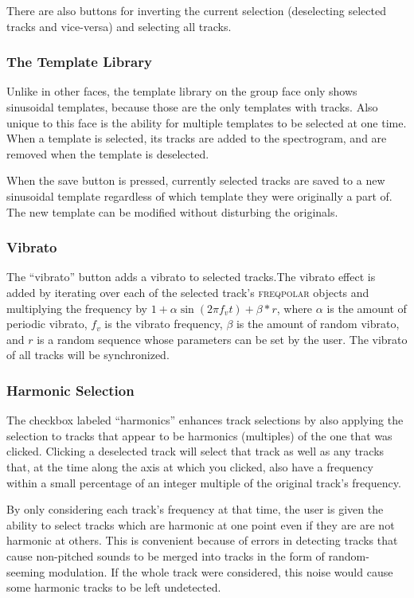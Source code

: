 \documentclass{article}
\newcommand{\noun}[1]{\textsc{#1}}
\begin{document}
There are also buttons for inverting the current selection (deselecting
selected tracks and vice-versa) and selecting all tracks.

\subsubsection{The Template Library}

Unlike in other faces, the template library on the group face only shows
sinusoidal templates, because those are the only templates with tracks. Also
unique to this face is the ability for multiple templates to be selected at one
time. When a template is selected, its tracks are added to the spectrogram, and
are removed when the template is deselected.

When the save button is pressed, currently selected tracks are saved to a new
sinusoidal template regardless of which template they were originally a part
of. The new template can be modified without disturbing the originals.

\subsubsection{Vibrato}

The ``vibrato'' button adds a vibrato to selected tracks.The vibrato effect is
added by iterating over each of the selected track's \noun{freqpolar} objects
and multiplying the frequency by $1+\alpha\sin(2 \pi f_v t)+\beta*r$, where
$\alpha$ is the amount of periodic vibrato, $f_v$ is the vibrato frequency,
$\beta$ is the amount of random vibrato, and $r$ is a random sequence whose
parameters can be set by the user.  The vibrato of all tracks will be
synchronized.


\subsubsection{\label{sub:harmonic-selection}Harmonic Selection}

The checkbox labeled ``harmonics'' enhances track selections by also applying
the selection to tracks that appear to be harmonics (multiples) of the one that
was clicked. Clicking a deselected track will select that track as well as any
tracks that, at the time along the axis at which you clicked, also have a
frequency within a small percentage of an integer multiple of the original
track's frequency.

By only considering each track's frequency at that time, the user is given the
ability to select tracks which are harmonic at one point even if they are are
not harmonic at others. This is convenient because of errors in detecting
tracks that cause non-pitched sounds to be merged into tracks in the form of
random-seeming modulation. If the whole track were considered, this noise would
cause some harmonic tracks to be left undetected.
\end{document}
